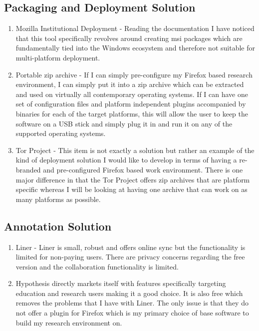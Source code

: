 \documentclass{article}
\begin{document}
\subsection{Packaging and Deployment Solution}
\begin{enumerate}
    \item Mozilla Institutional Deployment - Reading the documentation I have noticed that this tool specifically revolves around creating msi packages which are fundamentally tied into the Windows ecosystem and therefore not suitable for multi-platform deployment.
    \item Portable zip archive - If I can simply pre-configure my Firefox based research environment, I can simply put it into a zip archive which can be extracted and used on virtually all contemporary operating systems. If I can have one set of configuration files and platform independent plugins accompanied by binaries for each of the target platforms, this will allow the user to keep the software on a USB stick and simply plug it in and run it on any of the supported operating systems.
    \item Tor Project - This item is not exactly a solution but rather an example of the kind of deployment solution I would like to develop in terms of having a re-branded and pre-configured Firefox based work environment. There is one major difference in that the Tor Project offers zip archives that are platform specific whereas I will be looking at having one archive that can work on as many platforms as possible.
\end{enumerate}
\subsection{Annotation Solution}
\begin{enumerate}
    \item Liner - Liner is small, robust and offers online sync but the functionality is limited for non-paying users. There are privacy concerns regarding the free version and the collaboration functionality is limited.
    \item Hypothesis directly markets itself with features specifically targeting education and research users making it a good choice. It is also free which removes the problems that I have with Liner. The only issue is that they do not offer a plugin for Firefox which is my primary choice of base software to build my research environment on.
\end{enumerate}
\end{document}
